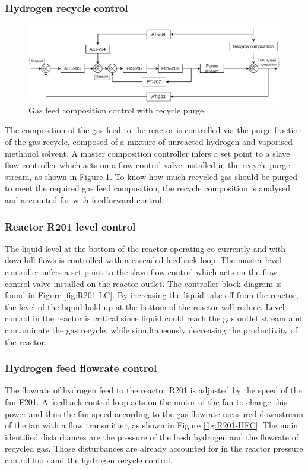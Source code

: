 \subsubsection{Hydrogen recycle control}%
    \begin{figure}
        \centering
        \includegraphics[width=\linewidth]{chapters/4-operation-control/4-Figures/V202-CC.pdf}
        \caption{Gas feed composition control with recycle purge}
        \label{fig:V202-CC}
    \end{figure}
The composition of the gas feed to the reactor is controlled via the purge fraction of the gas recycle, composed of a mixture of unreacted hydrogen and vaporised methanol solvent. A master composition controller infers a set point to a slave flow controller which acts on a flow control valve installed in the recycle purge stream, as shown in Figure \ref{fig:V202-CC}. To know how much recycled gas should be purged to meet the required gas feed composition, the recycle composition is analysed and accounted for with feedforward control. 

\subsubsection{Reactor R201 level control} %
The liquid level at the bottom of the reactor operating co-currently and with downhill flows is controlled with a cascaded feedback loop. The master level controller infers a set point to the slave flow control which acts on the flow control valve installed on the reactor outlet. The controller block diagram is found in Figure \ref{fig:R201-LC}. By increasing the liquid take-off from the reactor, the level of the liquid hold-up at the bottom of the reactor will reduce. Level control in the reactor is critical since liquid could reach the gas outlet stream and contaminate the gas recycle, while simultaneously decreasing the productivity of the reactor.

\subsubsection{Hydrogen feed flowrate control} %
The flowrate of hydrogen feed to the reactor R201 is adjusted by the speed of the fan F201. A feedback control loop acts on the motor of the fan to change this power and thus the fan speed according to the gas flowrate measured downstream of the fan with a flow transmitter, as shown in Figure \ref{fig:R201-HFC}. The main identified disturbances are the pressure of the fresh hydrogen and the flowrate of recycled gas. Those disturbances are already accounted for in the reactor pressure control loop and the hydrogen recycle control. 

